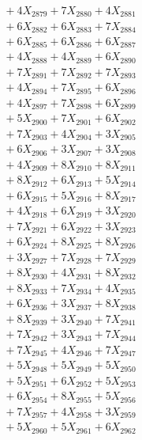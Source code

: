 \documentclass[a4paper,10pt]{article}
\begin{document}
{\begin{align}
&\;  + 4 X_{2879} + 7 X_{2880} + 4 X_{2881} \\[0.3ex]
&\;  + 6 X_{2882} + 6 X_{2883} + 7 X_{2884} \\[0.3ex]
&\;  + 6 X_{2885} + 6 X_{2886} + 6 X_{2887} \\[0.3ex]
&\;  + 4 X_{2888} + 4 X_{2889} + 6 X_{2890} \\[0.5ex]\allowbreak
&\;  + 7 X_{2891} + 7 X_{2892} + 7 X_{2893} \\[0.3ex]
&\;  + 4 X_{2894} + 7 X_{2895} + 6 X_{2896} \\[0.3ex]
&\;  + 4 X_{2897} + 7 X_{2898} + 6 X_{2899} \\[0.3ex]
&\;  + 5 X_{2900} + 7 X_{2901} + 6 X_{2902} \\[0.3ex]
&\;  + 7 X_{2903} + 4 X_{2904} + 3 X_{2905} \\[0.3ex]
&\;  + 6 X_{2906} + 3 X_{2907} + 3 X_{2908} \\[0.3ex]
&\;  + 4 X_{2909} + 8 X_{2910} + 8 X_{2911} \\[0.3ex]
&\;  + 8 X_{2912} + 6 X_{2913} + 5 X_{2914} \\[0.3ex]
&\;  + 6 X_{2915} + 5 X_{2916} + 8 X_{2917} \\[0.3ex]
&\;  + 4 X_{2918} + 6 X_{2919} + 3 X_{2920} \\[0.5ex]\allowbreak
&\;  + 7 X_{2921} + 6 X_{2922} + 3 X_{2923} \\[0.3ex]
&\;  + 6 X_{2924} + 8 X_{2925} + 8 X_{2926} \\[0.3ex]
&\;  + 3 X_{2927} + 7 X_{2928} + 7 X_{2929} \\[0.3ex]
&\;  + 8 X_{2930} + 4 X_{2931} + 8 X_{2932} \\[0.3ex]
&\;  + 8 X_{2933} + 7 X_{2934} + 4 X_{2935} \\[0.3ex]
&\;  + 6 X_{2936} + 3 X_{2937} + 8 X_{2938} \\[0.3ex]
&\;  + 8 X_{2939} + 3 X_{2940} + 7 X_{2941} \\[0.3ex]
&\;  + 7 X_{2942} + 3 X_{2943} + 7 X_{2944} \\[0.3ex]
&\;  + 7 X_{2945} + 4 X_{2946} + 7 X_{2947} \\[0.3ex]
&\;  + 5 X_{2948} + 5 X_{2949} + 5 X_{2950} \\[0.5ex]\allowbreak
&\;  + 5 X_{2951} + 6 X_{2952} + 5 X_{2953} \\[0.3ex]
&\;  + 6 X_{2954} + 8 X_{2955} + 5 X_{2956} \\[0.3ex]
&\;  + 7 X_{2957} + 4 X_{2958} + 3 X_{2959} \\[0.3ex]
&\;  + 5 X_{2960} + 5 X_{2961} + 6 X_{2962} \\[0.3ex]

\end{align}}
\end{document}
